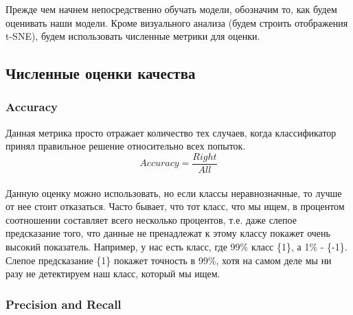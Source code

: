 \documentclass[11pt]{article}
\begin{document}
    Прежде чем начнем непосредственно обучать модели, обозначим то, как
будем оценивать наши модели. Кроме визуального анализа (будем строить
отображения t-SNE), будем использовать численные метрики для оценки.

    \subsection{Численные оценки
качества}\label{ux447ux438ux441ux43bux435ux43dux43dux44bux435-ux43eux446ux435ux43dux43aux438-ux43aux430ux447ux435ux441ux442ux432ux430}

    \subsubsection{Accuracy}\label{accuracy}

    Данная метрика просто отражает количество тех случаев, когда
классификатор принял правильное решение относительно всех попыток.
\[Accuracy = \dfrac{Right}{All}\]\\
Данную оценку можно использовать, но если классы неравнозначные, то
лучше от нее стоит отказаться. Часто бывает, что тот класс, что мы ищем,
в процентом соотношении составляет всего несколько процентов, т.е. даже
слепое предсказание того, что данные не пренадлежат к этому классу
покажет очень высокий показатель. Например, у нас есть класс, где 99\%
класс \{1\}, а 1\% - \{-1\}. Слепое предсказание \{1\} покажет точность
в 99\%, хотя на самом деле мы ни разу не детектируем наш класс, который
мы ищем.

    \subsubsection{Precision and Recall}\label{precision-and-recall}
\end{document}
